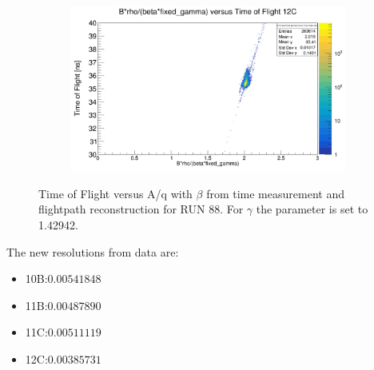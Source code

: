 \documentclass[12pt, letterpaper]{article}
\begin{document}
\begin{figure}[!htbp]
\begin{subfigure}{.5\textwidth}
  \caption{}
  \label{fig:sub-second}
\end{subfigure}
\begin{subfigure}{.5\textwidth}
  \centering
  \includegraphics[width=.9\linewidth]{brho_b_fix_g_12c.png} 
  \caption{}
  \label{fig:sub-second}
\end{subfigure}
\caption{Time of Flight versus A/q with  $\beta$ from time measurement and flightpath reconstruction for RUN 88. For $\gamma$ the parameter is set to 1.42942. }
\label{fig:aq_tof}
\end{figure}

The new resolutions from data are:\\
\begin{itemize}
\item 10B:$0.00541848$
\item 11B:$0.00487890$
\item 11C:$0.00511119$
\item 12C:$0.00385731$
\end{itemize}
\end{document}
